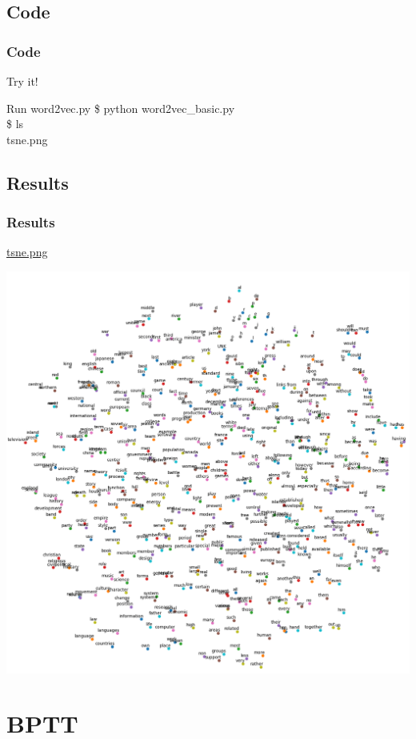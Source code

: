 \documentclass[pdf]{beamer}
\newenvironment{code}{\ttfamily\scriptsize\begin{block}}{\end{block}}
\begin{document}
\subsection{Code}
\begin{frame}
  \frametitle{Code}
  Try it!
  \begin{code}{Run word2vec.py}
    \$ python word2vec\_basic.py\\
    \$ ls\\
    tsne.png\\
    
  \end{code}
\end{frame}
\subsection{Results}
\begin{frame}
  \frametitle{Results}
  \href{tsne.png}{tsne.png}
  \begin{center}
    \includegraphics[scale=0.2]{tsne.png}
  \end{center}
  
\end{frame}

\section{BPTT}
\end{document}
